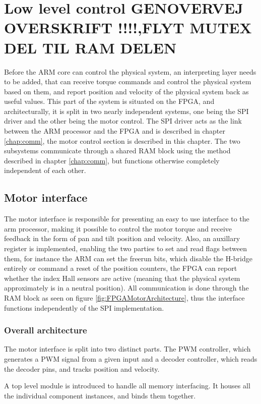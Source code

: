 \chapter{Low level control GENOVERVEJ OVERSKRIFT !!!!,FLYT MUTEX DEL TIL RAM DELEN}\label{chap:llc}


Before the ARM core can control the physical system, an interpreting layer needs to be added, that can receive torque commands and control the physical system based on them, and report position and velocity of the physical system back as useful values.
This part of the system is situated on the FPGA, and architecturally, it is split in two nearly independent systems, one being the SPI driver and the other being the motor control.
The SPI driver acts as the link between the ARM processor and the FPGA and is described in chapter \ref{chap:comm}, the motor control section is described in this chapter.
The two subsystems communicate through a shared RAM block using the method described in chapter \ref{chap:comm}, but functions otherwise completely independent of each other.


\section{Motor interface}
The motor interface is responsible for presenting an easy to use interface to the arm processor, making it possible to control the motor torque and receive feedback in the form of pan and tilt position and velocity.
Also, an auxillary register is implemented, enabling the two parties to set and read flags between them, for instance the ARM can set the freerun bits, which disable the H-bridge entirely or command a reset of the position counters, the FPGA can report whether the index Hall sensors are active (meaning that the physical system approximately is in a neutral position).
All communication is done through the RAM block as seen on figure \ref{fig:FPGAMotorArchitecture}, thus the interface functions independently of the SPI implementation.

\subsection{Overall architecture}
The motor interface is split into two distinct parts. The PWM controller, which generates a PWM signal from a given input and a decoder controller, which reads the decoder pins, and tracks position and velocity.

A top level module is introduced to handle all memory interfacing. It houses all the individual component instances, and binds them together.

